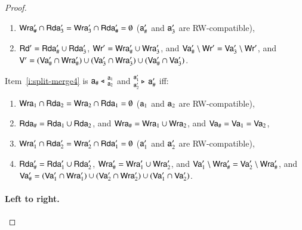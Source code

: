 \begin{proof}
\begin{enumerate}[resume]
    
    \item $\writeseta'_\# \cap \readseta'_3 = \writeseta'_3 \cap \readseta'_\# = \emptyset$ ($\modla'_\#$ and $\modla'_3$ are RW-compatible),
    \item $\readset' = \readseta'_\# \cup \readseta'_3$, $\writeset' = \writeseta'_\# \cup \writeseta'_3$, and $\valuseta'_\# \setminus \writeset' = \valuseta'_3 \setminus \writeset'$, and $\valuset' = (\valuseta'_\# \cap \writeseta'_\#) \cup (\valuseta'_3 \cap \writeseta'_3) \cup (\valuseta'_\# \cap \valuseta'_3) $. 
\end{enumerate}
Item~\ref{i:split-merge4} is $\splt{\modla_\#}{\modla_1} {\modla_2}$ and $\mrg{\modla'_\#}{\modla'_1} {\modla'_2}$ iff:
\begin{enumerate}[resume]
\item
  $\writeseta_1 \cap \readseta_2 = \writeseta_2 \cap \readseta_1 = \emptyset$ ($\modla_1$ and $\modla_2$ are RW-compatible),
  \item 
    $\readseta_\# = \readseta_1 \cup \readseta_2 $, and $\writeseta_\# = \writeseta_1 \cup \writeseta_2$, and $\valuseta_\# = \valuseta_1 = \valuseta_2$,

    
    \item $\writeseta'_1 \cap \readseta'_2 = \writeseta'_2 \cap \readseta'_1 = \emptyset$ ($\modla'_1$ and $\modla'_2$ are RW-compatible),
    \item\label{i:rhslast} $\readseta_\#' = \readseta'_1 \cup \readseta'_2$, $\writeseta_\#' = \writeseta'_1 \cup \writeseta'_2$, and $\valuseta'_1 \setminus \writeseta_\#' = \valuseta'_2 \setminus \writeseta_\#'$, and $\valuseta_\#' = (\valuseta'_1 \cap \writeseta'_1) \cup (\valuseta'_2 \cap \writeseta'_2) \cup (\valuseta'_1 \cap \valuseta'_2) $. 
\end{enumerate}


\paragraph{Left to right.}


\end{proof}
